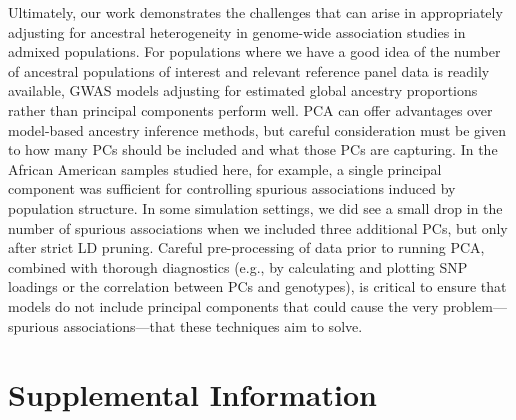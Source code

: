 \documentclass[12pt]{article}
\begin{document}
Ultimately, our work demonstrates the challenges that can arise in appropriately adjusting for ancestral heterogeneity in genome-wide association studies in admixed populations.
For populations where we have a good idea of the number of ancestral populations of interest and relevant reference panel data is readily available, GWAS models adjusting for estimated global ancestry proportions rather than principal components perform well. 
PCA can offer advantages over model-based ancestry inference methods, but careful consideration must be given to how many PCs should be included and what those PCs are capturing. 
In the African American samples studied here, for example, a single principal component was sufficient for controlling spurious associations induced by population structure. 
In some simulation settings, we did see a small drop in the number of spurious associations when we included three additional PCs, but only after strict LD pruning.
Careful pre-processing of data prior to running PCA, combined with thorough diagnostics (e.g., by calculating and plotting SNP loadings or the correlation between PCs and genotypes), is critical to ensure that models do not include principal components that could cause the very problem---spurious associations---that these techniques aim to solve.






\newpage

\section{Supplemental Information}

\end{document}
